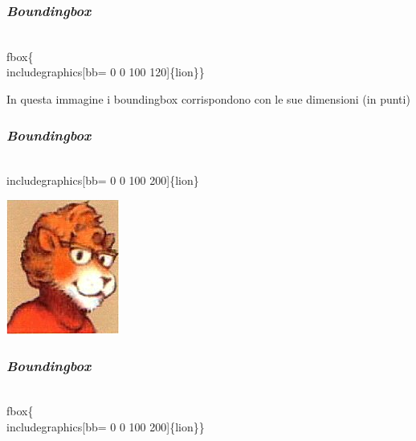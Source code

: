 \documentclass[svgnames,%
	ucs,%
	pdftex]{guitbeamer}
\begin{document}
\begin{frame}
  \frametitle{\textit{Boundingbox}}
	\begin{LaTeXcode}
		\\fbox\{\\includegraphics\alert{[bb= 0 0 100 120]}\{lion\}\}
	\end{LaTeXcode}
	\begin{center}
	\end{center}
	In questa immagine i boundingbox corrispondono con le sue dimensioni (in punti)
\end{frame}
\begin{frame}
  \frametitle{\textsl{Boundingbox}}
	\begin{LaTeXcode}
		\\includegraphics[bb= 0 0 100 \alert{200}]\{lion\}
	\end{LaTeXcode}
	\begin{center}
		\includegraphics[bb= 0 0 100 200]{lion}
	\end{center}
\end{frame}
\begin{frame}
  \frametitle{\textsl{Boundingbox}}
	\begin{LaTeXcode}
		\alert{\\fbox\{}\\includegraphics[bb= 0 0 100 \alert{200}]\{lion\}\alert{\}}
	\end{LaTeXcode}
	\begin{center}
	\end{center}
\end{frame}
\end{document}
